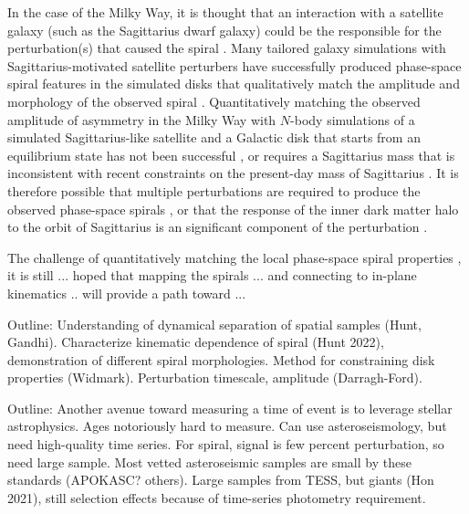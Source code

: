 In the case of the Milky Way, it is thought that an interaction with a satellite galaxy (such as the Sagittarius dwarf galaxy) could be the responsible for the perturbation(s) that caused the spiral \citep[e.g.,][]{Antoja:2018, Laporte:2019, Darling:2019}.
Many tailored galaxy simulations with Sagittarius-motivated satellite perturbers have successfully produced phase-space spiral features in the simulated disks that qualitatively match the amplitude and morphology of the observed spiral \citep{Khanna:2019, Laporte:2019, Bland-Hawthorn:2021, Hunt:2021, Gandhi:2022}.
Quantitatively matching the observed amplitude of asymmetry in the Milky Way with $N$-body simulations of a simulated Sagittarius-like satellite and a Galactic disk that starts from an equilibrium state has not been successful \citep{Bennett:2022}, or requires a Sagittarius mass that is inconsistent with recent constraints on the present-day mass of Sagittarius \citep{Vasiliev:XX}.
It is therefore possible that multiple perturbations are required to produce the observed phase-space spirals \citep[e.g.,][]{Garcia-Conde:2022}, or that the response of the inner dark matter halo to the orbit of Sagittarius is an significant component of the perturbation \citep{Grand:2022}.

The challenge of quantitatively matching the local phase-space spiral properties , it is still
... hoped that mapping the spirals ... and connecting to in-plane kinematics .. will provide a path toward ...

Outline: Understanding of dynamical separation of spatial samples (Hunt, Gandhi). Characterize kinematic dependence of spiral (Hunt 2022), demonstration of different spiral morphologies. Method for constraining disk properties (Widmark). Perturbation timescale, amplitude (Darragh-Ford).

Outline: Another avenue toward measuring a time of event is to leverage stellar astrophysics. Ages notoriously hard to measure. Can use asteroseismology, but need high-quality time series. For spiral, signal is few percent perturbation, so need large sample. Most vetted asteroseismic samples are small by these standards (APOKASC? others). Large samples from TESS, but giants (Hon 2021), still selection effects because of time-series photometry requirement.

